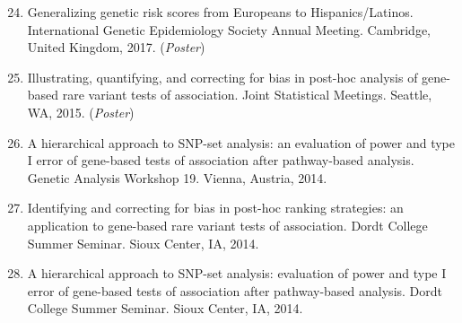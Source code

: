 \documentclass[margin]{res}
\newenvironment{benumerate}[1]{
    \let\oldItem\item
    \def\item{\addtocounter{enumi}{-2}\oldItem}
    
    \begin{enumerate}
    \setcounter{enumi}{#1}
    \addtocounter{enumi}{1}
}{
    \end{enumerate}
}
\begin{document}
\begin{resume}
\begin{benumerate}{23}
\item %
Generalizing genetic risk scores from Europeans to Hispanics/Latinos. International Genetic Epidemiology Society Annual Meeting. Cambridge, United Kingdom, 2017. (\textit{Poster})





\item %
Illustrating, quantifying, and correcting for bias in post-hoc analysis of gene-based rare variant tests of association. Joint Statistical Meetings. Seattle, WA, 2015. (\textit{Poster})


\item %
A hierarchical approach to SNP-set analysis: an evaluation of power and type I error of gene-based tests of association after pathway-based analysis. Genetic Analysis Workshop 19. Vienna, Austria, 2014.

\item %
Identifying and correcting for bias in post-hoc ranking strategies: an application to gene-based rare variant tests of association. Dordt College Summer Seminar. Sioux Center, IA, 2014.

\item %
A hierarchical approach to SNP-set analysis: evaluation of power and type I error of gene-based tests of association after pathway-based analysis. Dordt College Summer Seminar. Sioux Center, IA, 2014.


\end{benumerate}
\end{resume}
\end{document}
